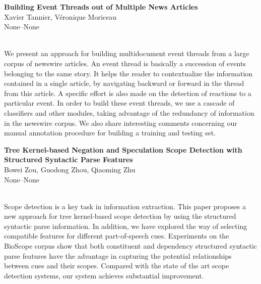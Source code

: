 \documentclass[twoside,makeidx]{book}
\begin{document}
\par\vspace{2em}\noindent%
\begin{minipage}{\linewidth}%
\begin{center}
\textbf{\normalsize Building Event Threads out of Multiple News Articles}\\
\normalsize  Xavier Tannier,  V\'{e}ronique Moriceau\\
{\small None--None}\\
\end{center}
\end{minipage}\\[0.5em]
\nopagebreak%
\noindent%
{\small We present an approach for building multidocument event threads from a large corpus of newswire articles. An event thread is basically a succession of events belonging to the same story. It helps the reader to contextualize the information contained in a single article, by navigating backward or forward in the thread from this article. A specific effort is also made on the detection of reactions to a particular event.   In order to build these event threads, we use a cascade of classifiers and other modules, taking advantage of the redundancy of information in the newswire corpus.   We also share interesting comments concerning our manual annotation procedure for building a training and testing set.}
\par\vspace{2em}\noindent%
\begin{minipage}{\linewidth}%
\begin{center}
\textbf{\normalsize Tree Kernel-based Negation and Speculation Scope Detection with Structured Syntactic Parse Features}\\
\normalsize  Bowei Zou,  Guodong Zhou,  Qiaoming Zhu\\
{\small None--None}\\
\end{center}
\end{minipage}\\[0.5em]
\nopagebreak%
\noindent%
{\small Scope detection is a key task in information extraction. This paper proposes a new approach for tree kernel-based scope detection by using the structured syntactic parse information. In addition, we have explored the way of selecting compatible features for different part-of-speech cues. Experiments on the BioScope corpus show that both constituent and dependency structured syntactic parse features have the advantage in capturing the potential relationships between cues and their scopes. Compared with the state of the art scope detection systems, our system achieves substantial improvement.}
\end{document}
